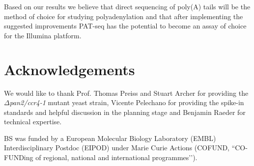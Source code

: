 \documentclass[10pt]{article}
\begin{document}
Based on our results we believe that direct sequencing of poly(A) tails will be the method of choice for studying polyadenylation and that after implementing the suggested improvements PAT-seq has the potential to become an assay of choice for the Illumina platform.
\section*{Acknowledgements}

We would like to thank Prof. Thomas Preiss and Stuart Archer for providing the \textit{$\Delta$pan2/ccr4-1} mutant yeast strain, Vicente Pelechano for providing the spike-in standards and helpful discussion in the planning stage and Benjamin Raeder for technical expertise.

BS was funded by a European Molecular Biology Laboratory (EMBL) Interdisciplinary Postdoc (EIPOD) under Marie Curie Actions (COFUND, ``CO-FUNDing of regional, national and international programmes’’).



\end{document}
